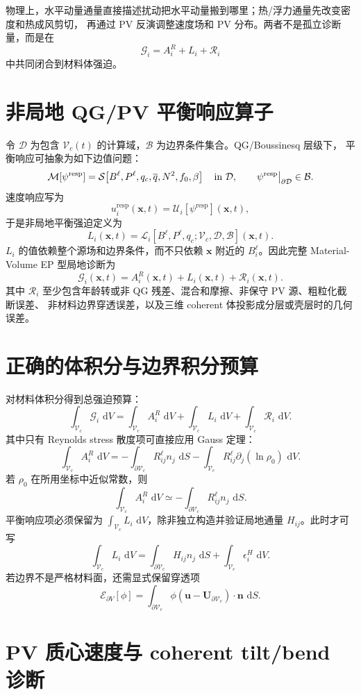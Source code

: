 \documentclass[12pt,a4paper]{ctexart}
\newcommand{\p}{\partial}
\newcommand{\dd}{\,\mathrm d}
\newcommand{\bx}{\boldsymbol x}
\newcommand{\bu}{\boldsymbol u}
\newcommand{\bU}{\boldsymbol U}
\newcommand{\bn}{\boldsymbol n}
\newcommand{\GG}{\mathcal G}
\newcommand{\LL}{\mathcal L}
\newcommand{\RR}{\mathcal R}
\newcommand{\VV}{\mathcal V_c}
\newcommand{\SSS}{\partial\mathcal V_c}
\newcommand{\MM}{\mathcal M}
\newcommand{\UU}{\mathcal U}
\newcommand{\SSrc}{\mathcal S}
\begin{document}
物理上，水平动量通量直接描述扰动把水平动量搬到哪里；热/浮力通量先改变密度和热成风剪切，
再通过 PV 反演调整速度场和 PV 分布。两者不是孤立诊断量，而是在
\[
  \GG_i=A_i^R+L_i+\RR_i
\]
中共同闭合到材料体强迫。

\section{非局地 QG/PV 平衡响应算子}

令 $\mathcal D$ 为包含 $\VV(t)$ 的计算域，$\mathcal B$ 为边界条件集合。QG/Boussinesq 层级下，
平衡响应可抽象为如下边值问题：
\[
  \MM[\psi^{\mathrm{resp}}]
  =
  \SSrc\!\left[B^{\ell},P^{\ell},q_c,\overline q,N^2,f_0,\beta\right]
  \quad \hbox{in } \mathcal D,
  \qquad
  \psi^{\mathrm{resp}}\big|_{\partial\mathcal D}\in\mathcal B.
\]
速度响应写为
\[
  u_i^{\mathrm{resp}}(\bx,t)
  =
  \UU_i[\psi^{\mathrm{resp}}](\bx,t),
\]
于是非局地平衡强迫定义为
\[
  L_i(\bx,t)
  =
  \LL_i\!\left[B^{\ell},P^{\ell},q_c;\VV,\mathcal D,\mathcal B\right](\bx,t).
\]
$L_i$ 的值依赖整个源场和边界条件，而不只依赖 $\bx$ 附近的 $B_i^{\ell}$。因此完整
Material-Volume EP 型局地诊断为
\[
  \boxed{
  \GG_i(\bx,t)
  =
  A_i^{R}(\bx,t)
  +
  L_i(\bx,t)
  +
  \RR_i(\bx,t)
  }.
\]
其中 $\RR_i$ 至少包含年龄转或非 QG 残差、混合和摩擦、非保守 PV 源、粗粒化截断误差、
非材料边界穿透误差，以及三维 coherent 体投影成分层或壳层时的几何误差。

\section{正确的体积分与边界积分预算}

对材料体积分得到总强迫预算：
\[
  \int_{\VV}\GG_i\,\dd V
  =
  \int_{\VV}A_i^{R}\,\dd V
  +
  \int_{\VV}L_i\,\dd V
  +
  \int_{\VV}\RR_i\,\dd V.
\]
其中只有 Reynolds stress 散度项可直接应用 Gauss 定理：
\[
  \int_{\VV}A_i^{R}\,\dd V
  =
  -\int_{\SSS}R_{ij}^{\ell}n_j\,\dd S
  -
  \int_{\VV}R_{ij}^{\ell}\p_j(\ln\rho_0)\,\dd V.
\]
若 $\rho_0$ 在所用坐标中近似常数，则
\[
  \int_{\VV}A_i^{R}\,\dd V
  \simeq
  -\int_{\SSS}R_{ij}^{\ell}n_j\,\dd S.
\]
平衡响应项必须保留为 $\int_{\VV}L_i\,\dd V$，除非独立构造并验证局地通量 $H_{ij}$。此时才可写
\[
  \int_{\VV}L_i\,\dd V
  =
  \int_{\SSS}H_{ij}n_j\,\dd S
  +
  \int_{\VV}\epsilon_i^{H}\,\dd V.
\]
若边界不是严格材料面，还需显式保留穿透项
\[
  \mathcal E_{\partial V}[\phi]
  =
  \int_{\SSS}\phi\left(\bu-\bU_{\SSS}\right)\cdot\bn\,\dd S.
\]

\section{PV 质心速度与 coherent tilt/bend 诊断}
\end{document}
